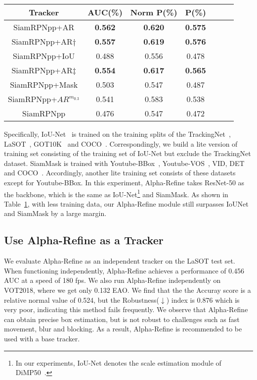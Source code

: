 \documentclass[final]{cvpr}
\begin{document}
{\begin{appendices}
\begin{table}[!h]
{\begin{tabular}{ccccccc}
   \hline
   \textbf{Tracker}     &\textbf{AUC}(\%)   &\textbf{Norm P}(\%)    &\textbf{P}(\%)  \\
    \hline
    SiamRPNpp+AR        &\textbf{\textcolor[rgb]{1,0,0}{0.562}} &\textbf{\textcolor[rgb]{1,0,0}{0.620}} &\textbf{\textcolor[rgb]{0,1,0}{0.575}}\\
    SiamRPNpp+AR$\dagger$   &\textbf{\textcolor[rgb]{0,1,0}{0.557}}   &\textbf{\textcolor[rgb]{0,1,0}{0.619}}   &\textbf{\textcolor[rgb]{1,0,0}{0.576}}\\
    SiamRPNpp+IoU       &0.488  &0.556  &0.478\\
    SiamRPNpp+AR$\ddagger$  &\textbf{\textcolor[rgb]{0,0,1}{0.554}}   &\textbf{\textcolor[rgb]{0,0,1}{0.617}}   &\textbf{\textcolor[rgb]{0,0,1}{0.565}}\\
    SiamRPNpp+Mask      &0.503  &0.547  &0.487  \\
SiamRPNpp+$AR^{m_{0.3}}$ &0.541  &0.583  &0.538  \\
    SiamRPNpp           &0.476  &0.547  &0.472  \\
    \hline
\end{tabular}}
\vspace{-3mm}
\label{tab:com-refine}
\end{table}

Specifically, IoU-Net~\cite{DiMP} is trained on the training splits of the TrackingNet~\cite{Trackingnet}, LaSOT~\cite{LaSOT}, GOT10K~\cite{GOT10K} and COCO~\cite{COCO}. Correspondingly, we build a lite version of training set consisting of the training set of IoU-Net but exclude the TrackingNet dataset. 
SiamMask is trained with Youtube-BBox~\cite{Youtube}, Youtube-VOS~\cite{youtube-vos}, VID, DET~\cite{ImageNet} and COCO~\cite{COCO}. Accordingly, another lite training set consists of these datasets except for Youtube-BBox. In this experiment, Alpha-Refine takes ResNet-50 as the backbone, which is the same as IoU-Net\footnote{In our experiments, IoU-Net denotes the scale estimation module of DiMP50~\cite{DiMP}.} and SiamMask. As shown in Table~\ref{tab:com-refine}, with less training data, our Alpha-Refine module still surpasses IoUNet and SiamMask by a large margin.



\subsection{Use Alpha-Refine as a Tracker}

We evaluate Alpha-Refine as an independent tracker on the LaSOT test set. When functioning independently, Alpha-Refine achieves a performance of 0.456 AUC at a speed of 180 fps. 
We also run Alpha-Refine independently on VOT2018, where we get only 0.132 EAO. We find that the the Accuray score is a relative normal value of 0.524, but the Robustness($\downarrow$) index is 0.876 which is very poor, indicating this method fails frequently. We observe that Alpha-Refine can obtain precise box estimation, but is not robust to challenges such as fast movement, blur and blocking. As a result, Alpha-Refine is recommended to be used with a base tracker.


\end{appendices}}
\end{document}
